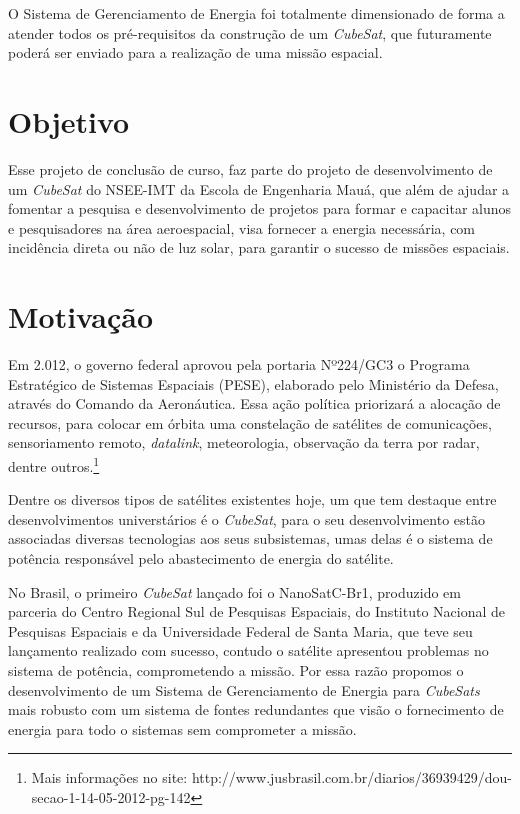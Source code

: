 \documentclass[
	12pt,				%
	openright,			%
	oneside,			%
	a4paper,			%
	english,			%
	french,				%
	spanish,			%
	brazil,				%
	oldfontcommands
	]{abntex2}
\begin{document}
	O Sistema de Gerenciamento de Energia foi totalmente dimensionado de forma a atender todos os pré-requisitos da construção de um \textit{CubeSat}, que futuramente poderá ser enviado para a realização de uma missão espacial.

\section[Objetivo]{Objetivo}

	Esse projeto de conclusão de curso, faz parte do projeto de desenvolvimento de um \textit{CubeSat} do NSEE-IMT da Escola de Engenharia Mauá, que além de ajudar a fomentar a pesquisa e desenvolvimento de projetos para formar e capacitar alunos e pesquisadores na área aeroespacial, visa fornecer a energia necessária, com incidência direta ou não de luz solar, para garantir o sucesso de missões espaciais.
	
\section[Motivação]{Motivação}

	Em 2.012, o governo federal aprovou pela portaria Nº224/GC3 o Programa Estratégico de Sistemas Espaciais (PESE), elaborado pelo Ministério da Defesa, através do Comando da Aeronáutica. Essa ação política priorizará a alocação de recursos, para colocar em órbita uma constelação de satélites de comunicações, sensoriamento remoto, \textit{datalink}, meteorologia, observação da terra por radar, dentre outros.\footnote{Mais informações no site: http://www.jusbrasil.com.br/diarios/36939429/dou-secao-1-14-05-2012-pg-142}

	Dentre os diversos tipos de satélites existentes hoje, um que tem destaque entre desenvolvimentos universtários é o \textit{CubeSat}, para o seu desenvolvimento estão associadas diversas tecnologias aos seus subsistemas, umas delas é o sistema de potência responsável pelo abastecimento de energia do satélite.

	No Brasil, o primeiro \textit{CubeSat} lançado foi o NanoSatC-Br1, produzido em parceria do Centro Regional Sul de Pesquisas Espaciais, do Instituto Nacional de Pesquisas Espaciais e da Universidade Federal de Santa Maria, que teve seu lançamento realizado com sucesso, contudo o satélite apresentou problemas no sistema de potência, comprometendo a missão. Por essa razão propomos o desenvolvimento de um Sistema de Gerenciamento de Energia para \textit{CubeSats} mais robusto com um sistema de fontes redundantes que visão o fornecimento de energia para todo o sistemas sem comprometer a missão.
\end{document}
